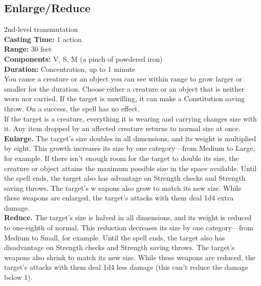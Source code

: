 \documentclass[11pt, A4paper, english]{article}
\begin{document}
		\subsection{Enlarge/Reduce}
2nd-level transmutation \\
\textbf{Casting Time:} 1 action \\
\textbf{Range:} 30 feet \\
\textbf{Components:} V, S, M (a pinch of powdered iron) \\
\textbf{Duration:} Concentration, up to 1 minute \\
You cause a creature or an object you can see within range to grow larger or smaller for the duration. Choose either a creature or an object that is neither worn nor carried. If the target is unwilling, it can make a Constitution saving throw. On a success, the spell has no effect. \\
If the target is a creature, everything it is wearing and carrying changes size with it. Any item dropped by an affected creature returns to normal size at once. \\
\textbf{Enlarge.} The target’s size doubles in all dimensions, and its weight is multiplied by eight. This growth increases its size by one category—from Medium to Large, for example. If there isn’t enough room for the target to double its size, the creature or object attains the maximum possible size in the space available. Until the spell ends, the target also has advantage on Strength checks and Strength saving throws. The target’s w eapons also grow to match its new size. While these weapons are enlarged, the target’s attacks with them deal 1d4 extra damage. \\
\textbf{Reduce.} The target’s size is halved in all dimensions, and its weight is reduced to one-eighth of normal. This reduction decreases its size by one category—from Medium to Small, for example. Until the spell ends, the target also has disadvantage on Strength checks and Strength saving throws. The target’s weapons also shrink to match its new size. While these weapons are reduced, the target’s attacks with them deal 1d4 less damage (this can’t reduce the damage below 1).
\end{document}
